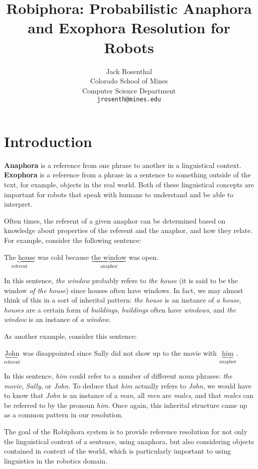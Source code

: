 \documentclass[12pt]{article}
\title{Robiphora: Probabilistic Anaphora and Exophora Resolution for Robots}
\author{%
Jack Rosenthal \\
Colorado School of Mines \\
Computer Science Department \\
\texttt{jrosenth@mines.edu}}
\date{}
\begin{document}
\maketitle

\section{Introduction}

\textbf{Anaphora} is a reference from one phrase to another in a linguistical
context. \textbf{Exophora} is a reference from a phrase in a sentence to
something outside of the text, for example, objects in the real world. Both of
these linguistical concepts are important for robots that speak with humans to
understand and be able to interpret.

Often times, the referent of a given anaphor can be determined based on
knowledge about properties of the referent and the anaphor, and how they
relate. For example, consider the following sentence:
\begin{center}
    $\underbrace{\text{The house}}_{\text{referent}}$ was cold because
    $\underbrace{\text{the window}}_{\text{anaphor}}$ was open.
\end{center}
In this sentence, \emph{the window} probably refers to \emph{the house} (it is
said to be the window \emph{of the house}) since houses often have windows. In
fact, we may almost think of this in a sort of inherital pattern: \emph{the
house} is an instance of \emph{a house}, \emph{houses} are a certain form of
\emph{buildings}, \emph{buildings} often have \emph{windows}, and \emph{the
window} is an instance of \emph{a window}.

As another example, consider this sentence:
\begin{center}
    $\underbrace{\text{John}}_{\text{referent}}$ was disappointed since Sally
    did not show up to the movie with
    $\underbrace{\text{him}}_{\text{anaphor}}$.
\end{center}
In this sentence, \emph{him} could refer to a number of different noun phrases:
\emph{the movie}, \emph{Sally}, or \emph{John}. To deduce that \emph{him}
actually refers to \emph{John}, we would have to know that \emph{John} is an
instance of a \emph{man}, all \emph{men} are \emph{males}, and that
\emph{males} can be referred to by the pronoun \emph{him}. Once again, this
inherital structure came up as a common pattern in our resolution.

The goal of the Robiphora system is to provide reference resolution for not
only the linguistical context of a sentence, using anaphora, but also
considering objects contained in context of the world, which is particularly
important to using linguistics in the robotics domain.
\end{document}
